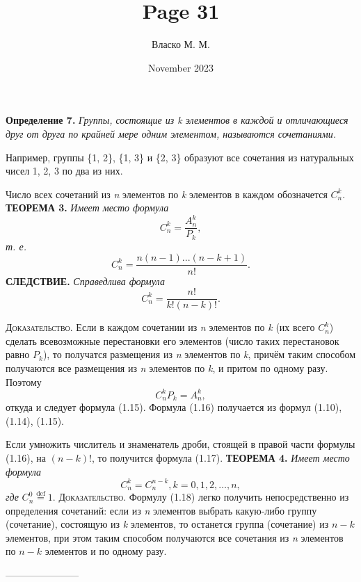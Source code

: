 \documentclass{article}
\title{Page 31}
\author{Власко М. М.}
\date{November 2023}
\begin{document}
{\setlength{\parindent}{0cm}
\textsf{\textbf{Определение 7.}}
\textit{Группы, состоящие из k элементов в каждой и отличающиеся друг от друга по крайней мере одним элементом, называются сочетаниями.}
}

Например, группы \{1, 2\}, \{1, 3\} и \{2, 3\} образуют все сочетания из натуральных чисел 1, 2, 3 по два из них.

Число всех сочетаний из \textit{n} элементов по \textit{k} элементов в каждом обозначется \(C_n^k\).
\newline
{\setlength{\parindent}{0cm}
   \textsc{\textbf{ТЕОРЕМА 3. }}\textit{Имеет место формула}
}
\[ C_n^k = \frac{A_n^k}{P_k}, \tag{1.15}\]
{\setlength{\parindent}{0cm}
   \textit{т. е.}
}
\[ C_n^k = \frac{n(n - 1)...(n - k + 1)}{n!}. \tag{1.16}\]
{\setlength{\parindent}{0cm}
   \textsc{\textbf{СЛЕДСТВИЕ. }}\textit{Справедлива формула}
}
\[ C_n^k = \frac{n!}{k!(n - k)!}. \tag{1.17}\]

{\setlength{\parindent}{0cm}
   \textsc{Доказательство.}
Если в каждом сочетании из \textit{n} элементов по \textit{k} (их всего \(C_n^k\)) сделать всевозможные перестановки
   его элементов (число таких перестановок равно \(P_k\)), то получатся размещения из \textit{n} элементов по
   \textit{k}, причём таким способом получаются все размещения из \textit{n} элементов по \textit{k}, и притом по
   одному разу. Поэтому \[ C_n^kP_k = A_n^k,\] откуда и следует формула (1.15).
   Формула (1.16) получается из формул
   (1.10), (1.14), (1.15).
}
\par{Если умножить числитель и знаменатель дроби, стоящей в правой части формулы (1.16), на \((n - k)\)!, то
получится формула (1.17).}
{\setlength{\parindent}{0cm}
   \textsc{\textbf{ТЕОРЕМА 4. }}\textit{Имеет место формула}
   \[ C_n^k = C_n^{n - k}, k = 0, 1, 2, \dots, n, \tag{1.18}\]
\textit{где} \(C_n^0 \stackrel{\text{def}}{=} 1\).
}
\newline
{\setlength{\parindent}{0cm}
   \textsc{\textsf{Доказательство.}}
Формулу (1.18) легко получить непосредственно из определения сочетаний: если из \textit{n} элементов выбрать какую-либо
   группу (сочетание), состоящую из \textit{k} элементов, то останется группа (сочетание) из \(n - k\) элементов, при
   этом таким способом получаются все сочетания из \textit{n} элементов по \(n - k\) элементов и по одному разу.
}

\centering
-----------------------
\end{document}
